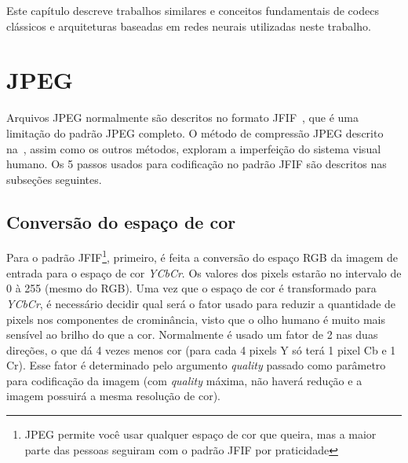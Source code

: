\newcommand{\texCommand}[1]{\texttt{\textbackslash{#1}}}%

\newcommand{\exemplo}[1]{%
\vspace{\baselineskip}%
\noindent\fbox{\begin{minipage}{\textwidth}#1\end{minipage}}%
\\\vspace{\baselineskip}}%

\newcommand{\exemploVerbatim}[1]{%
\vspace{\baselineskip}%
\noindent\fbox{\begin{minipage}{\textwidth}%
#1\end{minipage}}%
\\\vspace{\baselineskip}}%

Este capítulo descreve trabalhos similares e conceitos fundamentais de codecs clássicos e arquiteturas baseadas em redes neurais utilizadas neste trabalho.
\section{JPEG}
Arquivos JPEG normalmente são descritos no formato \acrshort{JFIF}~\cite{hamilton2004jpeg}, que é uma limitação do padrão JPEG completo. O método de compressão JPEG descrito na~, assim como os outros métodos, exploram a imperfeição do sistema visual humano. Os 5 passos usados para codificação no padrão JFIF são descritos nas subseções seguintes.
\subsection{Conversão do espaço de cor}
Para o padrão \acrshort{JFIF}\footnote{JPEG permite você usar qualquer espaço de cor que queira, mas a maior parte das pessoas seguiram com o padrão \acrshort{JFIF} por praticidade}, primeiro, é feita a conversão do espaço RGB da imagem de entrada para o espaço de cor \textit{YCbCr}. Os valores dos pixels estarão no intervalo de 0 à 255 (mesmo do RGB).
Uma vez que o espaço de cor é transformado para \textit{YCbCr}, é necessário decidir qual será o fator usado para reduzir a quantidade de pixels nos componentes de crominância, visto que o olho humano é muito mais sensível ao brilho do que a cor. Normalmente é usado um fator de 2 nas duas direções, o que dá 4 vezes menos cor (para cada 4 pixels Y só terá 1 pixel Cb e 1 Cr). Esse fator é determinado pelo argumento \textit{quality} passado como parâmetro para codificação da imagem (com \textit{quality} máxima, não haverá redução e a imagem possuirá a mesma resolução de cor).

